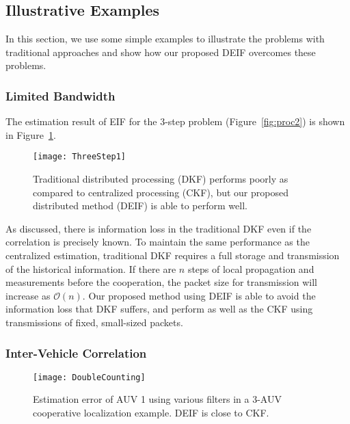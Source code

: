 \subsection{Illustrative Examples}

In this section, we use some simple examples to illustrate the problems with traditional approaches and show how our proposed DEIF overcomes these problems.

\subsubsection{Limited Bandwidth}

The estimation result of EIF for the 3-step problem (Figure~\ref{fig:proc2}) is shown in Figure~\ref{fig:ThreeStep}.

\begin{figure}[htbp]
\centering
\texttt{[image: ThreeStep1]}
\caption{Traditional distributed processing (DKF) performs poorly as compared to centralized processing (CKF), but our proposed distributed method (DEIF) is able to perform well.}
\label{fig:ThreeStep}
\end{figure}

As discussed, there is information loss in the traditional DKF even if the correlation is precisely known. To maintain the same performance as the centralized estimation, traditional DKF requires a full storage and transmission of the historical information. If there are $n$ steps of local propagation and measurements before the cooperation, the packet size for transmission will increase as $\mathcal{O}(n)$. Our proposed method using DEIF is able to avoid the information loss that DKF suffers, and perform as well as the CKF using transmissions of fixed, small-sized packets.

\subsubsection{Inter-Vehicle Correlation}
\begin{figure}[htbp]
\centering
\texttt{[image: DoubleCounting]}
\caption{Estimation error of AUV 1 using various filters in a 3-AUV cooperative localization example. DEIF is close to CKF.}
\label{fig:DoubleCounting}
\end{figure}


